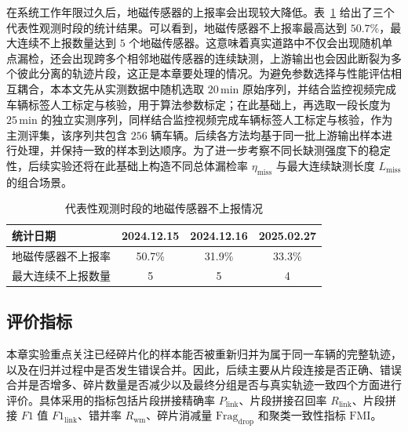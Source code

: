\documentclass{xdupgthesis}
\begin{document}
在系统工作年限过久后，地磁传感器的上报率会出现较大降低。表~\ref{tab:ch4_reporting_status} 给出了三个代表性观测时段的统计结果。可以看到，地磁传感器不上报率最高达到 $50.7\%$，最大连续不上报数量达到 $5$ 个地磁传感器。这意味着真实道路中不仅会出现随机单点漏检，还会出现跨多个相邻地磁传感器的连续缺测，上游输出也会因此断裂为多个彼此分离的轨迹片段，这正是本章要处理的情况。为避免参数选择与性能评估相互耦合，本本文先从实测数据中随机选取 $20\,\mathrm{min}$ 原始序列，并结合监控视频完成车辆标签人工标定与核验，用于算法参数标定；在此基础上，再选取一段长度为 $25\,\mathrm{min}$ 的独立实测序列，同样结合监控视频完成车辆标签人工标定与核验，作为主测评集，该序列共包含 $256$ 辆车辆。后续各方法均基于同一批上游输出样本进行处理，并保持一致的样本到达顺序。为了进一步考察不同长缺测强度下的稳定性，后续实验还将在此基础上构造不同总体漏检率 $\eta_{\mathrm{miss}}$ 与最大连续缺测长度 $L_{\mathrm{miss}}$ 的组合场景。

\begin{table}[htbp]
	\centering
	\caption{代表性观测时段的地磁传感器不上报情况}
	\label{tab:ch4_reporting_status}
	\begin{tabular}{lccc}
		\toprule
		统计日期 & 2024.12.15 & 2024.12.16 & 2025.02.27 \\
		\midrule
		地磁传感器不上报率 & 50.7\% & 31.9\% & 33.3\% \\
		最大连续不上报数量 & 5 & 5 & 4 \\
		\bottomrule
	\end{tabular}
\end{table}

\subsection{评价指标}

本章实验重点关注已经碎片化的样本能否被重新归并为属于同一车辆的完整轨迹，以及在归并过程中是否发生错误合并。因此，后续主要从片段连接是否正确、错误合并是否增多、碎片数量是否减少以及最终分组是否与真实轨迹一致四个方面进行评价。具体采用的指标包括片段拼接精确率 $P_{\mathrm{link}}$、片段拼接召回率 $R_{\mathrm{link}}$、片段拼接 $F1$ 值 $F1_{\mathrm{link}}$、错并率 $R_{\mathrm{wm}}$、碎片消减量 $\mathrm{Frag}_{\mathrm{drop}}$ 和聚类一致性指标 $\mathrm{FMI}$。
\end{document}
